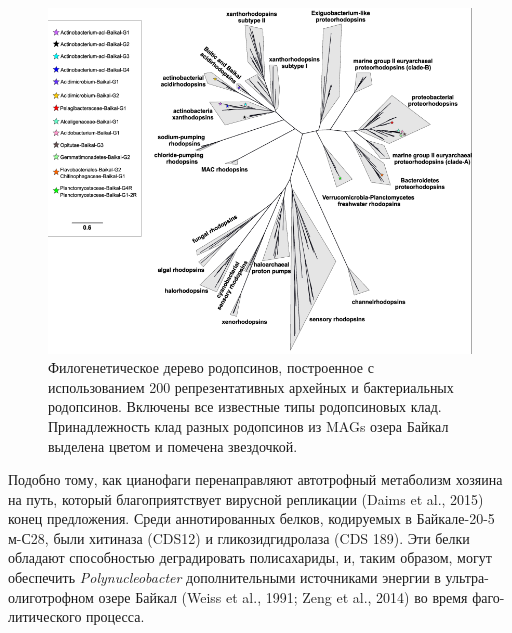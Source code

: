 \documentclass[a4paper,12pt,openany,final]{extreport}
\def\oldcaption{} \let\oldcaption=\caption
\def\caption{\stepcounter{captionsnum}\oldcaption}
\begin{document}
\begin{figure}\centering
\includegraphics[width=\linewidth]{media/image10.png}

\caption{Филогенетическое дерево родопсинов, построенное с
использованием 200 репрезентативных архейных и бактериальных родопсинов.
Включены все известные типы родопсиновых клад. Принадлежность клад
разных родопсинов из MAGs озера Байкал выделена цветом и помечена
звездочкой.}\label{fig:4-5}
\end{figure}

Подобно тому, как цианофаги перенаправляют автотрофный метаболизм
хозяина на путь, который благоприятствует вирусной репликации (Daims et
al., 2015) конец предложения. Среди аннотированных белков, кодируемых в
Байкале-20-5 м-С28, были хитиназа (CDS12) и гликозидгидролаза (CDS 189).
Эти белки обладают способностью деградировать полисахариды, и, таким
образом, могут обеспечить \emph{Polynucleobacter} дополнительными
источниками энергии в ультра-олиготрофном озере Байкал (Weiss et al.,
1991; Zeng et al., 2014) во время фаго-литического процесса.
\end{document}
